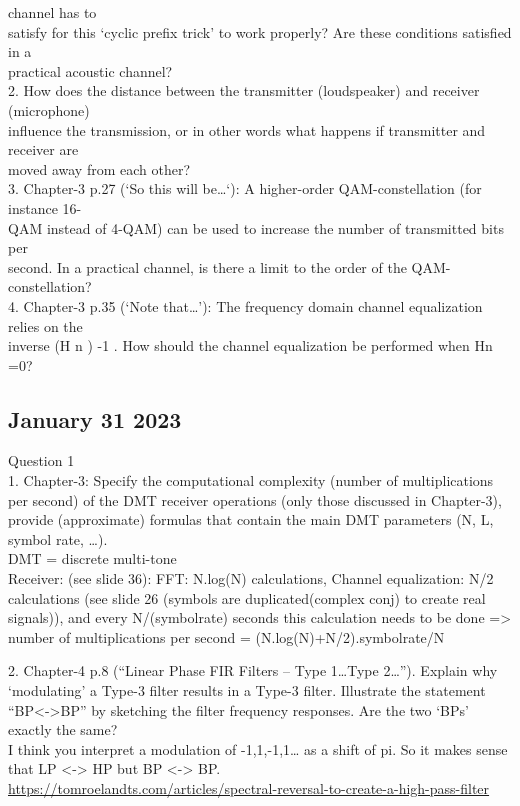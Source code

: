 \documentclass[
  a4paper,
  ,captions=tableheading
]{scrartcl}
\begin{document}
channel has to\\
satisfy for this `cyclic prefix trick' to work properly? Are these
conditions satisfied in a\\
practical acoustic channel?\\
2. How does the distance between the transmitter (loudspeaker) and
receiver (microphone)\\
influence the transmission, or in other words what happens if
transmitter and receiver are\\
moved away from each other?\\
3. Chapter-3 p.27 (`So this will be\ldots{}`): A higher-order
QAM-constellation (for instance 16-\\
QAM instead of 4-QAM) can be used to increase the number of transmitted
bits per\\
second. In a practical channel, is there a limit to the order of the
QAM-constellation?\\
4. Chapter-3 p.35 (`Note that\ldots{}'): The frequency domain channel
equalization relies on the\\
inverse (H n ) -1 . How should the channel equalization be performed
when Hn =0?

\subsection{January 31 2023}\label{january-31-2023}

Question 1\\
1. Chapter-3: Specify the computational complexity (number of
multiplications per second) of the DMT receiver operations (only those
discussed in Chapter-3), provide (approximate) formulas that contain the
main DMT parameters (N, L, symbol rate, \ldots).\\
DMT = discrete multi-tone\\
Receiver: (see slide 36): FFT: N.log(N) calculations, Channel
equalization: N/2 calculations (see slide 26 (symbols are
duplicated(complex conj) to create real signals)), and every
N/(symbolrate) seconds this calculation needs to be done =\textgreater{}
number of multiplications per second = (N.log(N)+N/2).symbolrate/N

2. Chapter-4 p.8 (``Linear Phase FIR Filters -- Type 1\ldots Type
2\ldots''). Explain why `modulating' a Type-3 filter results in a Type-3
filter. Illustrate the statement ``BP\textless-\textgreater BP'' by
sketching the filter frequency responses. Are the two `BPs' exactly the
same?\\
I think you interpret a modulation of -1,1,-1,1\ldots{} as a shift of
pi. So it makes sense that LP \textless-\textgreater{} HP but BP
\textless-\textgreater{} BP.\\
\url{https://tomroelandts.com/articles/spectral-reversal-to-create-a-high-pass-filter}
\end{document}
